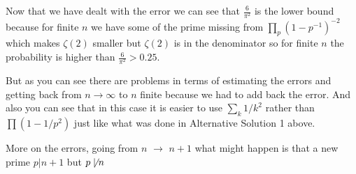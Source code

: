\documentclass[aps,preprint,preprintnumbers,nofootinbib,showpacs,prd]{revtex4-1}
\begin{document}
\begin{enumerate}
Now that we have dealt with the error we can see that $\frac{6}{\pi^2}$ is the lower bound because for finite $n$ we have some of the prime missing from $\prod_p (1 - p^{-1})^{-2}$ which makes $\zeta(2)$ smaller but $\zeta(2)$ is in the denominator so for finite $n$ the probability is higher than $\frac{6}{\pi^2} > 0.25$.

But as you can see there are problems in terms of estimating the errors and getting back from $n \to \infty$ to $n$ finite because we had to add back the error. And also you can see that in this case it is easier to use $\sum_k 1/k^2$ rather than $\prod (1 - 1/p^2)$ just like what was done in Alternative Solution 1 above.

%

\end{enumerate}
%







































More on the errors, going from $n$ $\to$ $n+1$ what might happen is that a new prime $p|n+1$ but $p\not\mid n$
\end{document}
